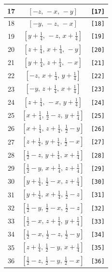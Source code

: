 \documentclass[fleqn,8pt]{jsarticle}
\begin{document}
\begin{longtable}{ccc}
17 & $\left[ - z,\, - x,\, - y \right]$ & {\tt [17]} \\ \hline
18 & $\left[ - y,\, - z,\, - x \right]$ & {\tt [18]} \\ \hline
19 & $\left[ y + \frac{1}{4},\, - z,\, x + \frac{1}{4} \right]$ & {\tt [19]} \\ \hline
20 & $\left[ z + \frac{1}{4},\, x + \frac{1}{4},\, - y \right]$ & {\tt [20]} \\ \hline
21 & $\left[ y + \frac{1}{4},\, z + \frac{1}{4},\, - x \right]$ & {\tt [21]} \\ \hline
22 & $\left[ - z,\, x + \frac{1}{4},\, y + \frac{1}{4} \right]$ & {\tt [22]} \\ \hline
23 & $\left[ - y,\, z + \frac{1}{4},\, x + \frac{1}{4} \right]$ & {\tt [23]} \\ \hline
24 & $\left[ z + \frac{1}{4},\, - x,\, y + \frac{1}{4} \right]$ & {\tt [24]} \\ \hline
25 & $\left[ x + \frac{1}{4},\, \frac{1}{2} - z,\, y + \frac{1}{4} \right]$ & {\tt [25]} \\ \hline
26 & $\left[ x + \frac{1}{4},\, z + \frac{1}{4},\, \frac{1}{2} - y \right]$ & {\tt [26]} \\ \hline
27 & $\left[ z + \frac{1}{4},\, y + \frac{1}{4},\, \frac{1}{2} - x \right]$ & {\tt [27]} \\ \hline
28 & $\left[ \frac{1}{2} - z,\, y + \frac{1}{4},\, x + \frac{1}{4} \right]$ & {\tt [28]} \\ \hline
29 & $\left[ \frac{1}{2} - y,\, x + \frac{1}{4},\, z + \frac{1}{4} \right]$ & {\tt [29]} \\ \hline
30 & $\left[ y + \frac{1}{4},\, \frac{1}{2} - x,\, z + \frac{1}{4} \right]$ & {\tt [30]} \\ \hline
31 & $\left[ y + \frac{1}{4},\, x + \frac{1}{4},\, \frac{1}{2} - z \right]$ & {\tt [31]} \\ \hline
32 & $\left[ \frac{1}{2} - y,\, \frac{1}{2} - x,\, \frac{1}{2} - z \right]$ & {\tt [32]} \\ \hline
33 & $\left[ \frac{1}{2} - x,\, z + \frac{1}{4},\, y + \frac{1}{4} \right]$ & {\tt [33]} \\ \hline
34 & $\left[ \frac{1}{2} - x,\, \frac{1}{2} - z,\, \frac{1}{2} - y \right]$ & {\tt [34]} \\ \hline
35 & $\left[ z + \frac{1}{4},\, \frac{1}{2} - y,\, x + \frac{1}{4} \right]$ & {\tt [35]} \\ \hline
36 & $\left[ \frac{1}{2} - z,\, \frac{1}{2} - y,\, \frac{1}{2} - x \right]$ & {\tt [36]} \\ \hline

\end{longtable}
\end{document}
